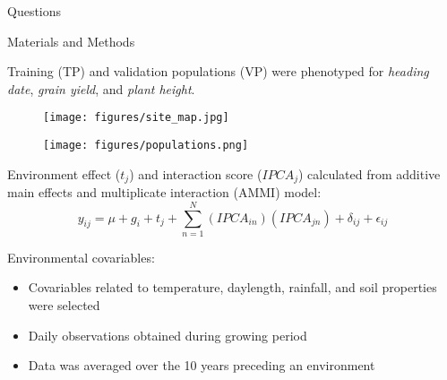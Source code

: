 \documentclass[final]{beamer}
\newlength{\onecolwid}
\begin{document}
\begin{frame}[t]
\begin{columns}[t]
\begin{column}{\onecolwid}
\begin{alertblock}{\large{Questions}}
\begin{footnotesize}
\end{footnotesize}


\end{alertblock}



\begin{block}{Materials and Methods}

Training (TP) and validation populations (VP) were phenotyped for \textit{heading date}, \textit{grain yield}, and \textit{plant height}.


\begin{figure}
  \begin{center}
  \begin{minipage}[m]{0.50\linewidth}
    \centering
    \texttt{[image: figures/site\_map.jpg]}
  \end{minipage}%
  \begin{minipage}[m]{0.50\linewidth}
    \centering
    \texttt{[image: figures/populations.png]}
  \end{minipage}%
\end{center}
\end{figure}


\vspace{1cm}

Environment effect ($t_j$) and interaction score ($IPCA_j$) calculated from additive main effects and multiplicate interaction (AMMI) model:
  $$y_{ij} = \mu + g_i + t_j + \sum^N_{n=1} (IPCA_{in})(IPCA_{jn}) + \delta_{ij} + \epsilon_{ij}$$


\vspace{1cm}


Environmental covariables:

\begin{footnotesize}

\begin{itemize}
  \item Covariables related to temperature, daylength, rainfall, and soil properties were selected
  \item Daily observations obtained during growing period
  \item Data was averaged over the 10 years preceding an environment
\end{itemize}


\end{footnotesize}
\end{block}
\end{column}
\end{columns}
\end{frame}
\end{document}
